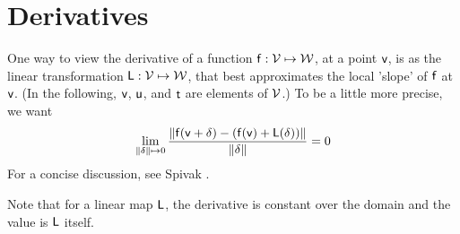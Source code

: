 
\section{Derivatives}
\label{sec:Derivatives}

One way to view the derivative of a function
$\mathsf{f}:\mathcal{V} \mapsto \mathcal{W}$,
at a point $\mathsf{v}$,
is as the linear transformation $\mathsf{L}:\mathcal{V} \mapsto \mathcal{W}$,
that best approximates the local 'slope' of $\mathsf{f}$ at $\mathsf{v}$.
(In the following, $\mathsf{v}$, $\mathsf{u}$, and $\mathsf{t}$ are elements of $\mathcal{V}$.)
To be a little more precise, we want
\begin{equation}
\lim_{ \|{\bf \delta}  \| \mapsto 0}
\frac{ \| \mathsf{f}(\mathsf{v} + {\bf \delta}) - (\mathsf{f}(\mathsf{v}) + \mathsf{L}({\bf\delta})) \|}
{\|{\bf \delta}  \| }
 = 0
\end{equation}
For a concise discussion, see Spivak \cite{spivak-1965}.

Note that for a linear map $\mathsf{L}$,
the derivative is constant over the domain
and the value is $\mathsf{L}$ itself.

